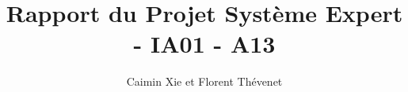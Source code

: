 \documentclass[a4paper, 12pt, final]{article}
\title{Rapport du Projet Système Expert - IA01 - A13}
\author{Caimin Xie et Florent Thévenet}
\begin{document}
\maketitle{}
\end{document}
